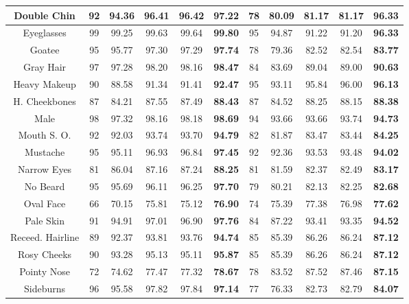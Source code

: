 \documentclass[wcp]{jmlr}
\begin{document}
\begin{table}
\begin{center}
\begin{tabular}{c|c|c|c|c|c||c|c|c|c|c|}
				\hline
				Double Chin & 92 & 94.36 & 96.41 & 96.42 & \textbf{97.22} & 78 & 80.09 & 81.17 & 81.17 & \textbf{96.33} \\
				\hline
				Eyeglasses & 99 & 99.25 & 99.63 & 99.64 & \textbf{99.80} & 95 & 94.87 & 91.22 & 91.20 & \textbf{96.33} \\
				\hline
				Goatee & 95 & 95.77 & 97.30 & 97.29 & \textbf{97.74} & 78 & 79.36 & 82.52 & 82.54 & \textbf{83.77} \\
				\hline
				Gray Hair & 97 & 97.28 & 98.20 & 98.16 & \textbf{98.47} & 84 & 83.69 & 89.04 & 89.00 & \textbf{90.63} \\
				\hline
				Heavy Makeup & 90 & 88.58 & 91.34 & 91.41 & \textbf{92.47} & 95 & 93.11 & 95.84 & 96.00 & \textbf{96.13} \\
				\hline
				H. Cheekbones & 87 & 84.21 & 87.55 & 87.49 & \textbf{88.43} & 87 & 84.52 & 88.25 & 88.15 & \textbf{88.38} \\
				\hline
				Male & 98 & 97.32 & 98.16 & 98.18 & \textbf{98.69} & 94 & 93.66 & 93.66 & 93.74 & \textbf{94.73} \\
				\hline
				Mouth S. O. & 92 & 92.03 & 93.74 & 93.70 & \textbf{94.79} & 82 & 81.87 & 83.47 & 83.44 & \textbf{84.25} \\
				\hline
				Mustache & 95 & 95.11 & 96.93 & 96.84 & \textbf{97.45} & 92 & 92.36 & 93.53 & 93.48 & \textbf{94.02} \\
				\hline
				Narrow Eyes & 81 & 86.04 & 87.16 & 87.24 & \textbf{88.25} & 81 & 81.59 & 82.37 & 82.49 & \textbf{83.17} \\
				\hline
				No Beard & 95 & 95.69 & 96.11 & 96.25 & \textbf{97.70} & 79 & 80.21 & 82.13 & 82.25 & \textbf{82.68} \\
				\hline
				Oval Face & 66 & 70.15 & 75.81 & 75.12 & \textbf{76.90} & 74 & 75.39 & 77.38 & 76.98 & \textbf{77.62} \\
				\hline
				Pale Skin & 91 & 94.91 & 97.01 & 96.90 & \textbf{97.76} & 84 & 87.22 & 93.41 & 93.35 & \textbf{94.52} \\
				\hline
				Receed. Hairline & 89 & 92.37 & 93.81 & 93.76 & \textbf{94.74} & 85 & 85.39 & 86.26 & 86.24 & \textbf{87.12} \\
				\hline
				Rosy Cheeks & 90 & 93.28 & 95.13 & 95.11 & \textbf{95.87} & 85 & 85.39 & 86.26 & 86.24 & \textbf{87.12} \\
				\hline
				Pointy Nose & 72 & 74.62 & 77.47 & 77.32 & \textbf{78.67} & 78 & 83.52 & 87.52 & 87.46 & \textbf{87.15} \\
				\hline
				Sideburns & 96 & 95.58 & 97.82 & 97.84 & \textbf{97.14} & 77 & 76.33 & 82.73 & 82.79 & \textbf{84.07} \\

\end{tabular}
\end{center}
\end{table}
\end{document}
